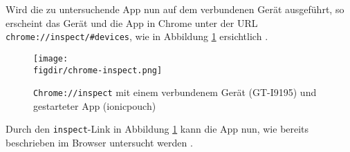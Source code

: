 Wird die zu untersuchende App nun auf dem verbundenen Gerät ausgeführt, so erscheint das Gerät und die App in Chrome unter der URL \texttt{chrome://inspect/\#devices}, wie in Abbildung \ref{fig:inspect} ersichtlich \cite{ionic:tips}.

\begin{figure}[htb]
	\centering
	\caption{\texttt{Chrome://inspect} mit einem verbundenem Gerät (GT-I9195) und gestarteter App (ionicpouch)}
	\label{fig:inspect}
	\texttt{[image: \\figdir/chrome-inspect.png]}
\end{figure}

Durch den \texttt{inspect}-Link in Abbildung \ref{fig:inspect} kann die App nun, wie bereits beschrieben im Browser untersucht werden \cite{ionic:tips}.

